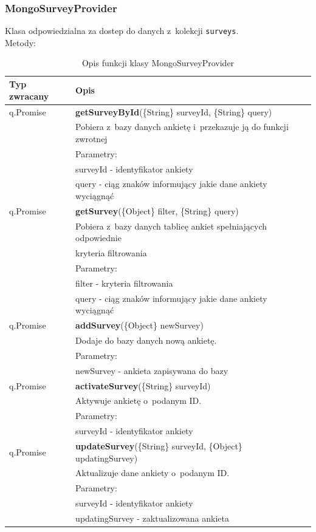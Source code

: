 \documentclass[8pt,a4paper,notitlepage]{article}
\begin{document}
\subsubsection{MongoSurveyProvider}
Klasa odpowiedzialna za dostep do danych z~kolekcji \texttt{surveys}. \\
Metody:
\begin{center}
\begin{table}[H]
\caption{Opis funkcji klasy MongoSurveyProvider}
  \begin{tabular}{| l| l|}%
    \hline
    Typ zwracany & Opis \\ \hline \hline
  	q.Promise	&	\textbf{getSurveyById}(\{String\} surveyId, \{String\} query) \\
 &  Pobiera z~bazy danych ankietę i~przekazuje ją do funkcji zwrotnej \\ 
 & Parametry: \\
 & surveyId - identyfikator ankiety \\ 
 & query - ciąg znaków informujący jakie dane ankiety wyciągnąć \\ \hline

q.Promise	&	\textbf{getSurvey}(\{Object\} filter, \{String\} query) \\
 &  Pobiera z~bazy danych tablicę ankiet spełniających odpowiednie  \\ & kryteria filtrowania \\ 
 & Parametry: \\
 & filter - kryteria filtrowania \\ 
 & query - ciąg znaków informujący jakie dane ankiety wyciągnąć \\ \hline
   
q.Promise	&	\textbf{addSurvey}(\{Object\} newSurvey) \\
 &  Dodaje do bazy danych nową ankietę.\\ 
 & Parametry: \\
 & newSurvey - ankieta zapisywana do bazy \\ 
 \hline

q.Promise	&	\textbf{activateSurvey}(\{String\} surveyId) \\
 &  Aktywuje ankietę o~podanym ID.\\ 
 & Parametry: \\
 & surveyId - identyfikator ankiety \\ 
 \hline
   
q.Promise	&	\textbf{updateSurvey}(\{String\} surveyId, \{Object\} updatingSurvey) \\
 &  Aktualizuje dane ankiety o~podanym ID. \\ 
 & Parametry: \\
 & surveyId - identyfikator ankiety \\ 
 & updatingSurvey - zaktualizowana ankieta \\ \hline


\end{tabular}
\end{table}
\end{center}
\end{document}
